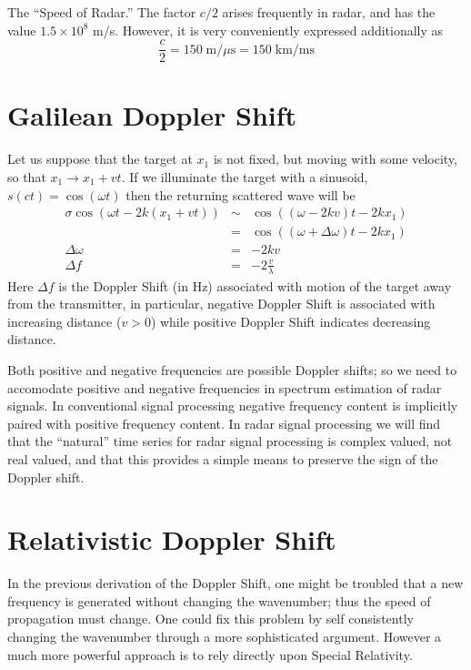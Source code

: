\newenvironment{factoid}{}{}

\begin{factoid} The ``Speed of Radar.''  The factor $c/2$ arises
  frequently in radar, and has the value $1.5\times 10^8$ m/s.
  However, it is very conveniently expressed additionally as
\begin{displaymath}
\frac{c}{2} = 150 \;\textrm{m}/\mu\textrm{s} = 150 \;\textrm{km/ms}
\end{displaymath}
\end{factoid}


\section{Galilean Doppler Shift}

Let us suppose that the target at $x_1$ is not fixed, but moving with
some velocity, so that $x_1 \rightarrow x_1 + vt$.  If we illuminate the target
with a sinusoid, $s(ct) = \cos(\omega t)$ then the returning
scattered wave will be
\begin{eqnarray*}
\sigma \cos(\omega t - 2 k (x_1 + vt)) &\sim& 
  \cos((\omega - 2kv) t - 2kx_1) \\
&=&\cos((\omega + \Delta \omega)t - 2kx_1) \\
\Delta \omega &=& -2kv \\[0.5ex]
\Delta f      &=& -2\frac{v}{\lambda}
\end{eqnarray*}
Here $\Delta f$ is the Doppler Shift (in Hz) associated with motion of
the target away from the transmitter, in particular, negative Doppler
Shift is associated with increasing distance ($v > 0$) while positive
Doppler Shift indicates decreasing distance.

Both positive and negative frequencies are possible Doppler shifts;
so we need to accomodate positive and negative frequencies in spectrum
estimation of radar signals.  In conventional signal processing
negative frequency content is implicitly paired with positive
frequency content. In radar signal processing we will find that the
``natural'' time series for radar signal processing is complex valued,
not real valued, and that this provides a simple means to preserve the
sign of the Doppler shift.

\section{Relativistic Doppler Shift}

In the previous derivation of the Doppler Shift, one might be troubled
that a new frequency is generated without changing the wavenumber;
thus the speed of propagation must change.  One could fix this problem
by self consistently changing the wavenumber through a more
sophisticated argument.  However a much more powerful approach is to
rely directly upon Special Relativity.

